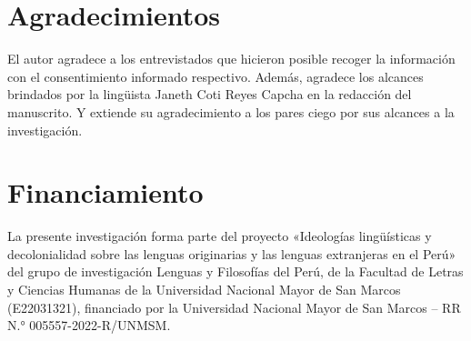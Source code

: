 \documentclass[spanish]{textolivre}
\begin{document}
\section{Agradecimientos}
El autor agradece a los entrevistados que hicieron posible recoger la información con el consentimiento informado respectivo. Además, agradece los alcances brindados por la lingüista Janeth Coti Reyes Capcha en la redacción del manuscrito. Y extiende su agradecimiento a los pares ciego por sus alcances a la investigación.

\section{Financiamiento}
La presente investigación forma parte del proyecto «Ideologías lingüísticas y decolonialidad sobre las lenguas originarias y las lenguas extranjeras en el Perú» del grupo de investigación Lenguas y Filosofías del Perú, de la Facultad de Letras y Ciencias Humanas de la Universidad Nacional Mayor de San Marcos (E22031321), financiado por la Universidad Nacional Mayor de San Marcos – RR N.° 005557-2022-R/UNMSM.


\printbibliography\label{sec-bib}
\end{document}
